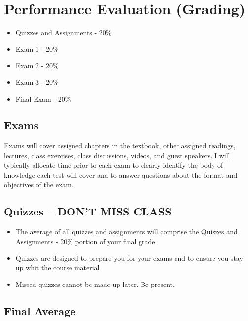 \documentclass[
]{book}
\providecommand{\tightlist}{%
  \setlength{\itemsep}{0pt}\setlength{\parskip}{0pt}}
\begin{document}
\hypertarget{performance-evaluation-grading}{%
\section{Performance Evaluation (Grading)}\label{performance-evaluation-grading}}

\begin{itemize}
\tightlist
\item
  Quizzes and Assignments - 20\%
\item
  Exam 1 - 20\%
\item
  Exam 2 - 20\%
\item
  Exam 3 - 20\%
\item
  Final Exam - 20\%
\end{itemize}

\hypertarget{exams}{%
\subsection{Exams}\label{exams}}

Exams will cover assigned chapters in the textbook, other assigned readings, lectures, class exercises, class discussions, videos, and guest speakers. I will typically allocate time prior to each exam to clearly identify the body of knowledge each test will cover and to answer questions about the format and objectives of the exam.

\hypertarget{quizzes-dont-miss-class}{%
\subsection{\texorpdfstring{Quizzes -- \textbf{DON'T MISS CLASS}}{Quizzes -- DON'T MISS CLASS}}\label{quizzes-dont-miss-class}}

\begin{itemize}
\tightlist
\item
  The average of all quizzes and assignments will comprise the Quizzes and Assignments - 20\% portion of your final grade
\item
  Quizzes are designed to prepare you for your exams and to ensure you stay up whit the course material
\item
  Missed quizzes cannot be made up later. Be present.
\end{itemize}

\hypertarget{final-average}{%
\subsection{Final Average}\label{final-average}}
\end{document}
